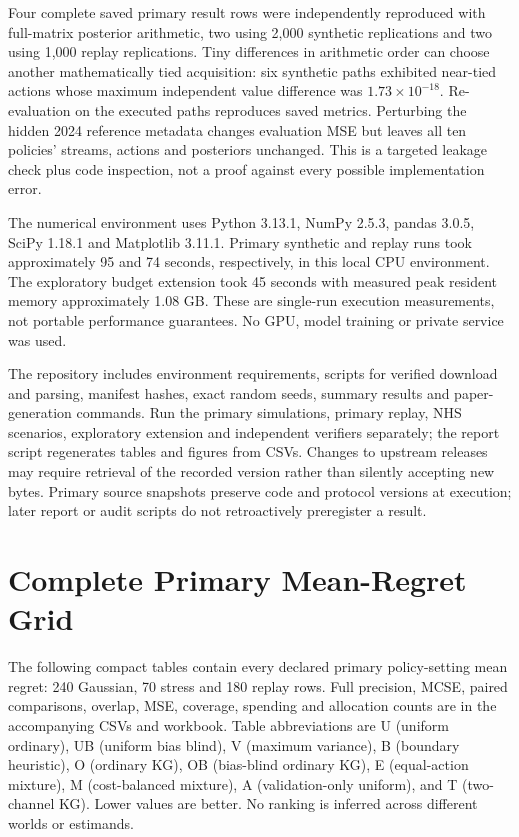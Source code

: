 Four complete saved primary result rows were independently reproduced with full-matrix posterior arithmetic, two using 2,000 synthetic replications and two using 1,000 replay replications. Tiny differences in arithmetic order can choose another mathematically tied acquisition: six synthetic paths exhibited near-tied actions whose maximum independent value difference was $1.73\times10^{-18}$. Re-evaluation on the executed paths reproduces saved metrics. Perturbing the hidden 2024 reference metadata changes evaluation MSE but leaves all ten policies' streams, actions and posteriors unchanged. This is a targeted leakage check plus code inspection, not a proof against every possible implementation error.

The numerical environment uses Python 3.13.1, NumPy 2.5.3, pandas 3.0.5, SciPy 1.18.1 and Matplotlib 3.11.1. Primary synthetic and replay runs took approximately 95 and 74 seconds, respectively, in this local CPU environment. The exploratory budget extension took 45 seconds with measured peak resident memory approximately 1.08 GB. These are single-run execution measurements, not portable performance guarantees. No GPU, model training or private service was used.

The repository includes environment requirements, scripts for verified download and parsing, manifest hashes, exact random seeds, summary results and paper-generation commands. Run the primary simulations, primary replay, NHS scenarios, exploratory extension and independent verifiers separately; the report script regenerates tables and figures from CSVs. Changes to upstream releases may require retrieval of the recorded version rather than silently accepting new bytes. Primary source snapshots preserve code and protocol versions at execution; later report or audit scripts do not retroactively preregister a result.

\section{Complete Primary Mean-Regret Grid}
The following compact tables contain every declared primary policy-setting mean regret: 240 Gaussian, 70 stress and 180 replay rows. Full precision, MCSE, paired comparisons, overlap, MSE, coverage, spending and allocation counts are in the accompanying CSVs and workbook. Table abbreviations are U (uniform ordinary), UB (uniform bias blind), V (maximum variance), B (boundary heuristic), O (ordinary KG), OB (bias-blind ordinary KG), E (equal-action mixture), M (cost-balanced mixture), A (validation-only uniform), and T (two-channel KG). Lower values are better. No ranking is inferred across different worlds or estimands.

